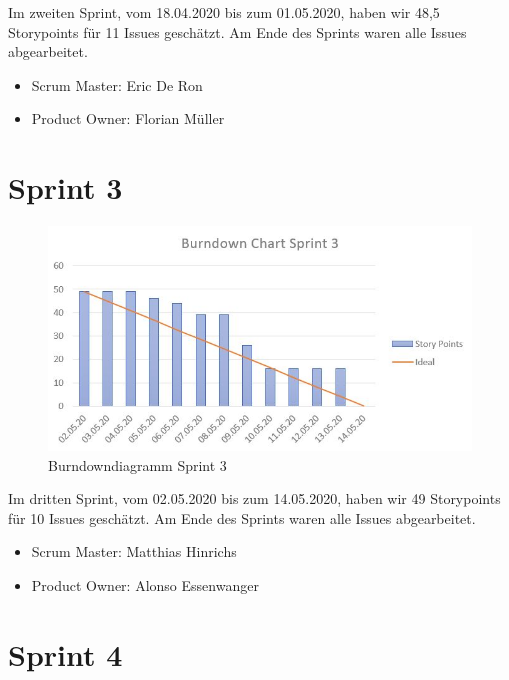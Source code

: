 Im zweiten Sprint, vom 18.04.2020 bis zum 01.05.2020, haben wir 48,5 Storypoints für 11 Issues geschätzt. Am Ende des Sprints waren alle Issues abgearbeitet.
\begin{itemize}
\item Scrum Master: Eric De Ron
\item Product Owner: Florian Müller
\end{itemize}

\newpage
\section{Sprint 3}

\begin{figure}[H]
	\centering
	\includegraphics[width=\textwidth]{burndown/sprint3.jpg}
	\caption{Burndowndiagramm Sprint 3}
	\label{figure:burndown_sprint3}
\end{figure}

Im dritten Sprint, vom 02.05.2020 bis zum 14.05.2020, haben wir 49 Storypoints für 10 Issues geschätzt. Am Ende des Sprints waren alle Issues abgearbeitet.
\begin{itemize}
\item Scrum Master: Matthias Hinrichs
\item Product Owner: Alonso Essenwanger
\end{itemize}

\newpage
\section{Sprint 4}

